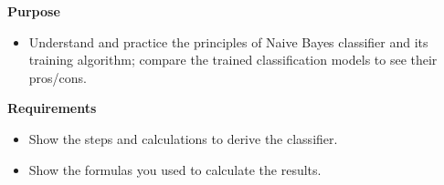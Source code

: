 \documentclass[12pt,letterpaper]{article}
\begin{document}
				
				
				
				\textbf{Purpose} 
				\begin{itemize}
					\item Understand and practice the principles of Naive Bayes classifier and its training algorithm; compare the trained classification models to see their pros/cons.
				\end{itemize}
				
				\textbf{Requirements}
				\begin{itemize}
					\setlength{\itemsep}{1pt}
					\item Show the steps and calculations to derive the classifier.
					\item Show the formulas you used to calculate the results.
				\end{itemize}
				
\end{document}
